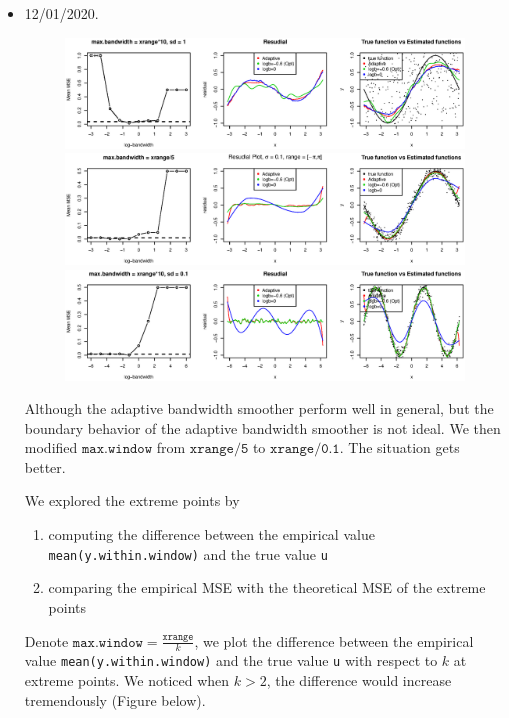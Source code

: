 \documentclass{article}
\begin{document}
\begin{itemize}
\item 12/01/2020. 
\begin{figure}[H]
\includegraphics[width=\linewidth]{pic/sim.plot1.eps}
\includegraphics[width=\linewidth]{pic/sim.plot2.eps}
\includegraphics[width=\linewidth]{pic/sim.plot3.eps}
\end{figure}

Although the adaptive bandwidth smoother perform well in general, but the boundary behavior of the adaptive bandwidth smoother is not ideal. We then modified $\texttt{max.window}$ from $\texttt{xrange/5}$ to $\texttt{xrange/0.1}$. The situation gets better. 

We explored the extreme points by 
\begin{enumerate}
\item computing the difference between the empirical value \texttt{mean(y.within.window)} and the true value \texttt{u}
\item comparing the empirical MSE with the theoretical MSE of the extreme points
\end{enumerate}

Denote $\texttt{max.window} = \frac{\texttt{xrange}}{k}$, we plot the difference between the empirical value \texttt{mean(y.within.window)} and the true value \texttt{u} with respect to $k$ at extreme points. We noticed when $k>2$, the difference would increase tremendously (Figure below).


\end{itemize}
\end{document}
